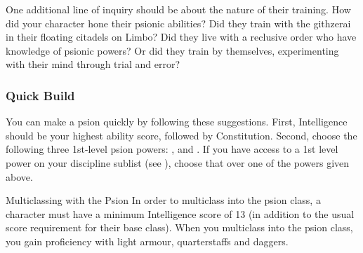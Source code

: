 One additional line of inquiry should be about the nature
of their training.
How did your character hone their psionic abilities?
Did they train with the githzerai in their floating citadels
on Limbo?
Did they live with a reclusive order who have knowledge
of psionic powers?
Or did they train by themselves,
experimenting with their mind through trial and error?

\subsubsection{Quick Build}
You can make a psion quickly by following these suggestions.
First, Intelligence should be your highest ability score,
followed by Constitution.
Second, choose the following three 1st-level psion powers:
,
and .
If you have access to a 1st level power on your discipline
sublist (see ),
choose that over one of the powers given above.

\begin{DndSidebar}[float=htbp]{Multiclassing with the Psion}
    In order to
    multiclass into the psion class,
    a character must have a minimum Intelligence score of 13
    (in addition to the usual score requirement for their base class).
    When you multiclass into the psion class,
    you gain proficiency with
    light armour, quarterstaffs and daggers.
\end{DndSidebar}

